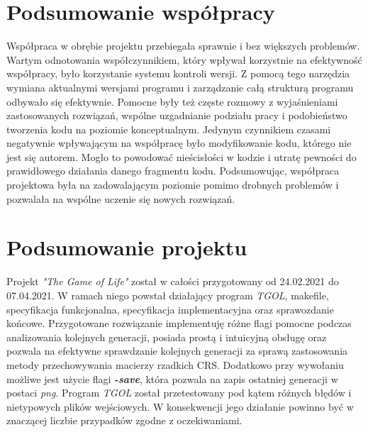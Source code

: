 \documentclass[11pt,a4paper]{report}
\begin{document}
\newpage

\section{Podsumowanie współpracy}\label{sec:teskt}
Współpraca w obrębie projektu przebiegała sprawnie i bez większych problemów. Wartym odnotowania współczynnikiem, który wpływał korzystnie na efektywność współpracy, było korzystanie systemu kontroli wersji. Z pomocą tego narzędzia wymiana aktualnymi wersjami programu i zarządzanie całą strukturą programu odbywało się efektywnie. Pomocne były też częste rozmowy z wyjaśnieniami zastosowanych rozwiązań, wspólne uzgadnianie podziału pracy i podobieństwo tworzenia kodu na poziomie konceptualnym. Jedynym czynnikiem czasami negatywnie wpływającym na współpracę było modyfikowanie kodu, którego nie jest się autorem. Mogło to powodować nieścisłości w kodzie i utratę pewności do prawidłowego działania danego fragmentu kodu. Podsumowując, współpraca projektowa była na zadowalającym poziomie pomimo drobnych problemów i pozwalała na wspólne uczenie się nowych rozwiązań. 

\section{Podsumowanie projektu}\label{sec:teskt}
Projekt  \textsl{"The Game of Life"} został w całości przygotowany od 24.02.2021 do 07.04.2021. W ramach niego powstał działający program  \textsl{TGOL}, makefile,  specyfikacja funkcjonalna, specyfikacja implementacyjna oraz sprawozdanie końcowe. Przygotowane rozwiązanie implementuję różne flagi pomocne podczas analizowania kolejnych generacji, posiada prostą i intuicyjną obsługę oraz pozwala na efektywne sprawdzanie kolejnych generacji za sprawą zastosowania metody przechowywania macierzy rzadkich CRS. Dodatkowo przy wywołaniu możliwe jest użycie flagi \textsl{\textbf{-save}}, która pozwala na zapis ostatniej generacji w postaci \textsl{png}. Program \textsl{TGOL} został przetestowany pod kątem różnych błędów i nietypowych plików wejściowych. W konsekwencji jego działanie powinno być w znaczącej liczbie przypadków zgodne z oczekiwaniami. 

\end{document}
